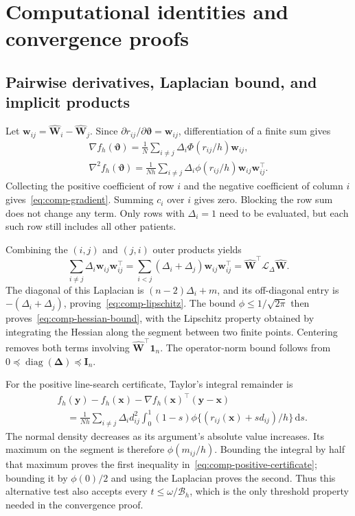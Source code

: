 \section{Computational identities and convergence proofs}
\label{app:computation}

\subsection{Pairwise derivatives, Laplacian bound, and implicit products}
\label{subapp:comp-derivatives}
Let $\bm{w}_{ij}=\widehat{\bm{W}}_i-\widehat{\bm{W}}_j$. Since $\partial r_{ij}/\partial\bm{\vartheta}=\bm{w}_{ij}$, differentiation of a finite sum gives
\[\begin{gathered}
 \nabla f_h(\bm{\vartheta})=\frac1N\sum_{i\ne j}\Delta_i\Phi(r_{ij}/h)\bm{w}_{ij},\\
 \nabla^2f_h(\bm{\vartheta})=\frac1{Nh}\sum_{i\ne j}\Delta_i\phi(r_{ij}/h)\bm{w}_{ij}\bm{w}_{ij}^\top.
\end{gathered}\]
Collecting the positive coefficient of row $i$ and the negative coefficient of column $i$ gives~\eqref{eq:comp-gradient}. Summing $c_i$ over $i$ gives zero. Blocking the row sum does not change any term. Only rows with $\Delta_i=1$ need to be evaluated, but each such row still includes all other patients.

Combining the $(i,j)$ and $(j,i)$ outer products yields
\[
 \sum_{i\ne j}\Delta_i\bm{w}_{ij}\bm{w}_{ij}^\top
 =\sum_{i<j}(\Delta_i+\Delta_j)\bm{w}_{ij}\bm{w}_{ij}^\top
 =\widehat{\bm{W}}^\top\bm{\mathscr L}_\Delta\widehat{\bm{W}}.
\]
The diagonal of this Laplacian is $(n-2)\Delta_i+m$, and its off-diagonal entry is $-(\Delta_i+\Delta_j)$, proving~\eqref{eq:comp-lipschitz}. The bound $\phi\le1/\sqrt{2\pi}$ then proves~\eqref{eq:comp-hessian-bound}, with the Lipschitz property obtained by integrating the Hessian along the segment between two finite points. Centering removes both terms involving $\widehat{\bm{W}}^\top\mathbf 1_n$. The operator-norm bound follows from $0\preceq\operatorname{diag}(\bm\Delta)\preceq \bm{I}_n$. 

For the positive line-search certificate, Taylor's integral remainder is
\[\begin{aligned}
&f_h(\bm y)-f_h(\bm x)-\nabla f_h(\bm x)^\top(\bm y-\bm x)\\
&\quad=\frac1{Nh}\sum_{i\ne j}\Delta_i d_{ij}^2
 \int_0^1(1-s)\phi\{(r_{ij}(\bm x)+s d_{ij})/h\}\,\mathrm{d}s.
\end{aligned}\]
The normal density decreases as its argument's absolute value increases. Its maximum on the segment is therefore $\phi(m_{ij}/h)$. Bounding the integral by half that maximum proves the first inequality in~\eqref{eq:comp-positive-certificate}; bounding it by $\phi(0)/2$ and using the Laplacian proves the second. Thus this alternative test also accepts every $t\le\omega/\mathscr B_h$, which is the only threshold property needed in the convergence proof.


